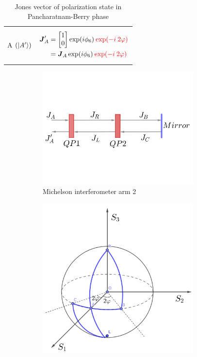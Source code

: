 \documentclass[11pt,a4paper]{article}
\numberwithin{equation}{section}
\begin{document}
\begin{table}[H]
\begin{tabular}{c c}
 	A $(\ket{A'})$&
 	\parbox{5cm}{\begin{align*}
 			\boldsymbol{J}_A' 
 			&=\begin{bmatrix}1\\0\end{bmatrix} \exp(i\phi_6)\:{\color{red}\exp(-i\:2\varphi)}\\
 			&=\boldsymbol{J}_A \exp(i\phi_6)\:{\color{red}\exp(-i\:2\varphi)}
 	\end{align*}}\\
 	\hline
 	\hline
	\end{tabular}
 	\caption{Jones vector of polarization state in Pancharatnam-Berry phase}
 	\label{table:5}
\end{table}

 \begin{figure}[t]
	\begin{subfigure}[H]{0.50\textwidth}
		\centering
		\includegraphics[width=0.9\textwidth]{MI arm.png}
		\caption{Michelson interferometer arm 2}
		\label{fig:pancha a}
	\end{subfigure}
	\hfil
	\begin{subfigure}[H]{0.4\textwidth}
		\centering
		\includegraphics[width=0.9\textwidth]{poincare-pb.png}

\end{subfigure}
\end{figure}
\end{document}
